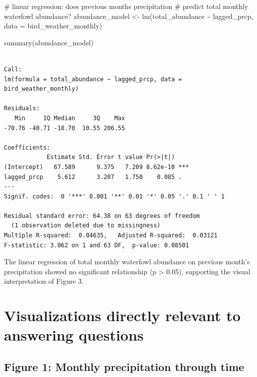 \documentclass[
  letterpaper,
  DIV=11,
  numbers=noendperiod]{scrartcl}
\newenvironment{Shaded}{\begin{snugshade}}{\end{snugshade}}
\newcommand{\AttributeTok}[1]{\textcolor[rgb]{0.40,0.45,0.13}{#1}}
\newcommand{\CommentTok}[1]{\textcolor[rgb]{0.37,0.37,0.37}{#1}}
\newcommand{\FunctionTok}[1]{\textcolor[rgb]{0.28,0.35,0.67}{#1}}
\newcommand{\NormalTok}[1]{\textcolor[rgb]{0.00,0.23,0.31}{#1}}
\newcommand{\OtherTok}[1]{\textcolor[rgb]{0.00,0.23,0.31}{#1}}
\newcommand{\SpecialCharTok}[1]{\textcolor[rgb]{0.37,0.37,0.37}{#1}}
\begin{document}
\begin{Shaded}
\begin{Highlighting}[]
\CommentTok{\# linear regression: does previous month\textquotesingle{}s precipitation}
\CommentTok{\# predict total monthly waterfowl abundance?}
\NormalTok{abundance\_model }\OtherTok{\textless{}{-}} \FunctionTok{lm}\NormalTok{(total\_abundance }\SpecialCharTok{\textasciitilde{}}\NormalTok{ lagged\_prcp,}
                      \AttributeTok{data =}\NormalTok{ bird\_weather\_monthly)}

\FunctionTok{summary}\NormalTok{(abundance\_model)}
\end{Highlighting}
\end{Shaded}

\begin{verbatim}

Call:
lm(formula = total_abundance ~ lagged_prcp, data = bird_weather_monthly)

Residuals:
   Min     1Q Median     3Q    Max 
-70.76 -40.71 -18.70  10.55 206.55 

Coefficients:
            Estimate Std. Error t value Pr(>|t|)    
(Intercept)   67.589      9.375   7.209 8.62e-10 ***
lagged_prcp    5.612      3.207   1.750    0.085 .  
---
Signif. codes:  0 '***' 0.001 '**' 0.01 '*' 0.05 '.' 0.1 ' ' 1

Residual standard error: 64.38 on 63 degrees of freedom
  (1 observation deleted due to missingness)
Multiple R-squared:  0.04635,   Adjusted R-squared:  0.03121 
F-statistic: 3.062 on 1 and 63 DF,  p-value: 0.08501
\end{verbatim}

The linear regression of total monthly waterfowl abundance on previous
month's precipitation showed no significant relationship (p
\textgreater{} 0.05), supporting the visual interpretation of Figure 3.

\section{Visualizations directly relevant to answering
questions}\label{visualizations-directly-relevant-to-answering-questions}

\subsection{Figure 1: Monthly precipitation through
time}\label{figure-1-monthly-precipitation-through-time}
\end{document}
